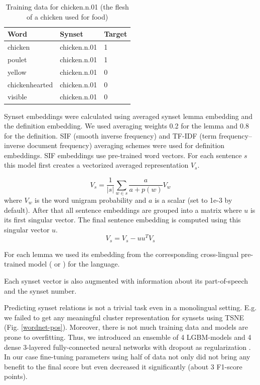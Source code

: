 \documentclass[11pt,a4paper]{article}
\begin{document}
	\begin{table}[!htbp]
	\small
	\caption{Training data for chicken.n.01 (the flesh of a chicken used for food)}
	\label{wordnet-training-data}		
	\centering
	\begin{tabular}{|l|l|l|}
		\hline
		Word & Synset & Target
		\\
		\hline
		chicken & chicken.n.01 & 1
		\\
		poulet & chicken.n.01 & 1
		\\
		yellow & chicken.n.01 & 0
		\\
		chickenhearted & chicken.n.01 & 0
		\\
		visible & chicken.n.01 & 0
		\\
		\hline
	\end{tabular}
	
\end{table}

Synset embeddings were calculated using averaged synset lemma embedding and the definition embedding. We used averaging weights 0.2 for the lemma and 0.8 for the definition. SIF (smooth inverse frequency) and TF-IDF (term frequency–inverse document frequency) averaging schemes were used for definition embeddings. SIF \cite{Arora2017} embeddings use pre-trained word vectors. For each sentence $s$ this model first creates a vectorized averaged representation $V_s$.

$$V_s = \dfrac{1}{|s|}\sum_{w \in s} \frac{a}{a + p(w)}V_w$$
where $V_w$ is the word unigram probability and $a$ is a scalar (set to 1e-3 by default).
After that all sentence embeddings are grouped into a matrix where $u$ is its first singular vector. The final sentence embedding is computed using this singular vector $u$.
$$V_s = V_s - uu^TV_s$$


For each lemma we used its embedding from the corresponding cross-lingual pre-trained model (\cite{muse} or \cite{joulin2018loss}) for the language.

Each synset vector is also augmented with information about its part-of-speech and the synset number.

Predicting synset relations is not a trivial task even in a monolingual setting. E.g. we failed to get any meaningful cluster representation for synsets using TSNE \cite{tsne} (Fig. \ref{wordnet-pos}). Moreover, there is not much training data and models are prone to overfitting. Thus, we introduced an ensemble of 4 LGBM-models \cite{lgbm} and 4 dense 3-layered fully-connected neural networks with dropout as regularization \cite{dropout}.
In our case fine-tuning parameters using half of data not only did not bring any benefit to the final score but even decreased it significantly (about 3 F1-score points).
\end{document}

